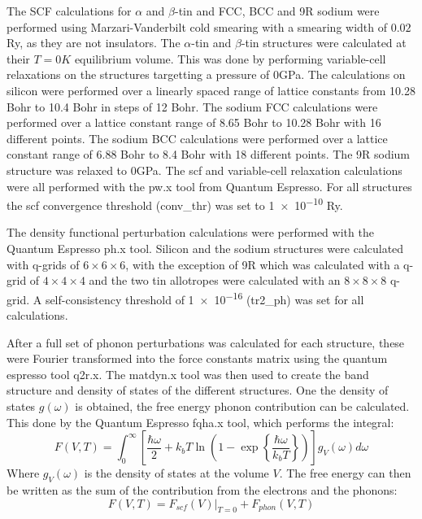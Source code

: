 \documentclass[12pt]{article}
\begin{document}
The SCF calculations for $\alpha$ and $\beta$-tin and FCC, BCC and 9R sodium were performed using Marzari-Vanderbilt cold smearing \cite{marzari1999thermal} with a smearing width of $0.02$ Ry, as they are not insulators. 
The $\alpha$-tin and $\beta$-tin structures were calculated at their $T=0K$ equilibrium volume. This was done by performing variable-cell relaxations on the structures targetting a pressure of $0$GPa. The calculations on silicon were performed over a linearly spaced range of lattice constants from 10.28 Bohr to 10.4 Bohr in steps of 12 Bohr. 
The sodium FCC calculations were performed over a lattice constant range of 8.65 Bohr to 10.28 Bohr with 16 different points. The sodium BCC calculations were performed over a lattice constant range of 6.88 Bohr to 8.4 Bohr with 18 different points. 
The 9R sodium structure was relaxed to 0GPa. The scf and variable-cell relaxation calculations were all performed with the pw.x tool from Quantum Espresso. For all structures the scf convergence threshold (conv\_thr) was set to \num{1e-10} Ry.

The density functional perturbation calculations were performed with the Quantum Espresso ph.x tool. Silicon and the sodium structures were calculated with q-grids of $6\times 6\times 6$, with the exception of 9R which was calculated with a q-grid of $4\times4\times4$ and the two tin allotropes were calculated with an $8\times8\times8$ q-grid. A self-consistency threshold of \num{1e-16} (tr2\_ph) was set for all calculations.

After a full set of phonon perturbations was calculated for each structure, these were Fourier transformed into the force constants matrix using the quantum espresso tool q2r.x. The matdyn.x tool was then used to create the band structure and density of states of the different structures. One the density of states $g(\omega)$ is obtained, the free energy phonon contribution can be calculated. This done by the Quantum Espresso fqha.x tool, which performs the integral:
\begin{equation}
	\label{eq:phononfreeenergy}
	F(V, T) = \int_0^\infty \left[\frac{\hbar\omega}{2} + k_bT \ln\left(1-\exp\left\{\frac{\hbar \omega}{k_bT}\right\} \right) \right]g_V(\omega) d\omega
\end{equation}
Where $g_V(\omega)$ is the density of states at the volume $V$. The free energy can then be written as the sum of the contribution from the electrons and the phonons: 
\begin{equation}\label{eq:total_free_energy}
F(V, T) = F_{scf}(V)|_{T=0} + F_{phon}(V, T)
\end{equation}
\end{document}
